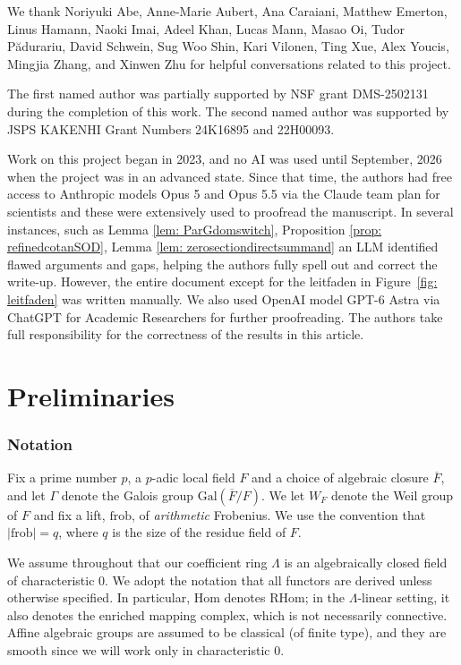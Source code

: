\documentclass{amsart}
\theoremstyle{definition}
\theoremstyle{remark}
\numberwithin{equation}{section}
\newcommand{\ov}{\overline}
\newcommand{\Gal}{\mathrm{Gal}}
\newcommand{\Hom}{\mathrm{Hom}}
\newcommand{\frob}{\mathrm{frob}}
\newcommand{\RHom}{\mathrm{RHom}}
\begin{document}
We thank Noriyuki Abe, Anne-Marie Aubert, Ana Caraiani, Matthew Emerton, Linus Hamann, Naoki Imai, Adeel Khan, Lucas Mann, Masao Oi, Tudor P\u{a}durariu, David Schwein, Sug Woo Shin, Kari Vilonen, Ting Xue, Alex Youcis, Mingjia Zhang, and Xinwen Zhu for helpful conversations related to this project.

The first named author was partially supported by NSF grant DMS-2502131 during the completion of this work. The second named author was supported by JSPS KAKENHI Grant Numbers 24K16895 and 22H00093. 

Work on this project began in 2023, and no AI was used until September, 2026 when the project was in an advanced state. Since that time, the authors had free access to Anthropic models Opus 5 and Opus 5.5 via the Claude team plan for scientists and these were extensively used to proofread the manuscript. In several instances, such as Lemma \ref{lem: ParGdomswitch}, Proposition \ref{prop: refinedcotanSOD}, Lemma \ref{lem: zerosectiondirectsummand} an LLM identified flawed arguments and gaps, helping the authors fully spell out and correct the write-up. However, the entire document except for the leitfaden in Figure~\ref{fig: leitfaden} was written manually. We also used OpenAI model GPT-6 Astra via ChatGPT for Academic Researchers for further proofreading. The authors take full responsibility for the correctness of the results in this article.

\part{Preliminaries}{\label{p: preliminaries}}

\section{Notation}{\label{s: notation}}


Fix a prime number $p$, a $p$-adic local field $F$ and a choice of algebraic closure $\ov{F}$, and let $\Gamma$ denote the Galois group $\Gal(\ov{F} / F)$. We let $W_F$ denote the Weil group of $F$ and fix a lift, $\frob$, of \emph{arithmetic} Frobenius. We use the convention that $\lvert \frob \rvert =q$, where $q$ is the size of the residue field of $F$. 

We assume throughout that our coefficient ring $\Lambda$ is an algebraically closed field of characteristic $0$. We adopt the notation that all functors are derived unless otherwise specified. In particular, $\Hom$ denotes $\RHom$; in the $\Lambda$-linear setting, it also denotes the enriched mapping complex, which is not necessarily connective. Affine algebraic groups are assumed to be classical (of finite type), and they are smooth since we will work only in characteristic 0.  
\end{document}
